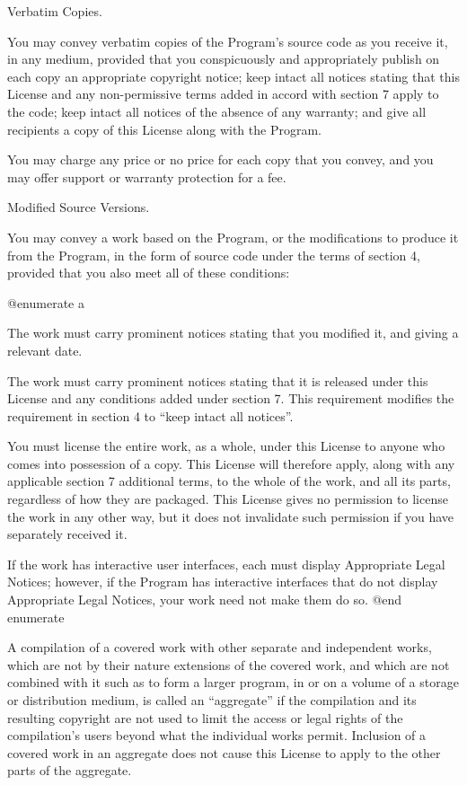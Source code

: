 \itemConveying Verbatim Copies.

You may convey verbatim copies of the Program's source code as you
receive it, in any medium, provided that you conspicuously and
appropriately publish on each copy an appropriate copyright notice;
keep intact all notices stating that this License and any
non-permissive terms added in accord with section 7 apply to the code;
keep intact all notices of the absence of any warranty; and give all
recipients a copy of this License along with the Program.

You may charge any price or no price for each copy that you convey,
and you may offer support or warranty protection for a fee.

\itemConveying Modified Source Versions.

You may convey a work based on the Program, or the modifications to
produce it from the Program, in the form of source code under the
terms of section 4, provided that you also meet all of these
conditions:

@enumerate a
\item
The work must carry prominent notices stating that you modified it,
and giving a relevant date.

\item
The work must carry prominent notices stating that it is released
under this License and any conditions added under section 7.  This
requirement modifies the requirement in section 4 to ``keep intact all
notices''.

\item
You must license the entire work, as a whole, under this License to
anyone who comes into possession of a copy.  This License will
therefore apply, along with any applicable section 7 additional terms,
to the whole of the work, and all its parts, regardless of how they
are packaged.  This License gives no permission to license the work in
any other way, but it does not invalidate such permission if you have
separately received it.

\item
If the work has interactive user interfaces, each must display
Appropriate Legal Notices; however, if the Program has interactive
interfaces that do not display Appropriate Legal Notices, your work
need not make them do so.
@end enumerate

A compilation of a covered work with other separate and independent
works, which are not by their nature extensions of the covered work,
and which are not combined with it such as to form a larger program,
in or on a volume of a storage or distribution medium, is called an
``aggregate'' if the compilation and its resulting copyright are not
used to limit the access or legal rights of the compilation's users
beyond what the individual works permit.  Inclusion of a covered work
in an aggregate does not cause this License to apply to the other
parts of the aggregate.

